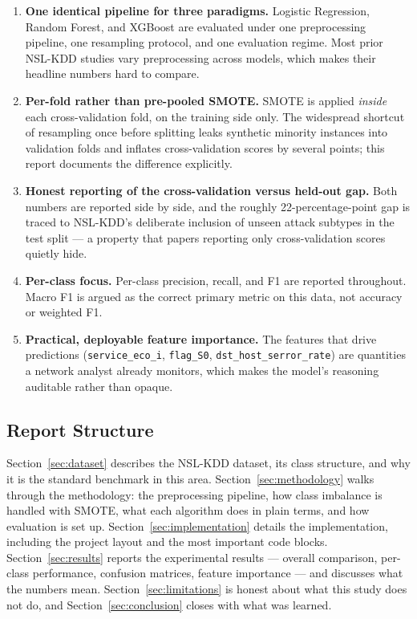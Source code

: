 \documentclass[11pt, a4paper]{article}
\begin{document}
\begin{enumerate}
    \item \textbf{One identical pipeline for three paradigms.} Logistic Regression, Random Forest, and XGBoost are evaluated under one preprocessing pipeline, one resampling protocol, and one evaluation regime. Most prior NSL-KDD studies vary preprocessing across models, which makes their headline numbers hard to compare.
    \item \textbf{Per-fold rather than pre-pooled SMOTE.} SMOTE is applied \emph{inside} each cross-validation fold, on the training side only. The widespread shortcut of resampling once before splitting leaks synthetic minority instances into validation folds and inflates cross-validation scores by several points; this report documents the difference explicitly.
    \item \textbf{Honest reporting of the cross-validation versus held-out gap.} Both numbers are reported side by side, and the roughly 22-percentage-point gap is traced to NSL-KDD's deliberate inclusion of unseen attack subtypes in the test split --- a property that papers reporting only cross-validation scores quietly hide.
    \item \textbf{Per-class focus.} Per-class precision, recall, and F1 are reported throughout. Macro F1 is argued as the correct primary metric on this data, not accuracy or weighted F1.
    \item \textbf{Practical, deployable feature importance.} The features that drive predictions (\texttt{service\_eco\_i}, \texttt{flag\_S0}, \texttt{dst\_host\_serror\_rate}) are quantities a network analyst already monitors, which makes the model's reasoning auditable rather than opaque.
\end{enumerate}

\subsection{Report Structure}
Section~\ref{sec:dataset} describes the NSL-KDD dataset, its class structure, and why it is the standard benchmark in this area. Section~\ref{sec:methodology} walks through the methodology: the preprocessing pipeline, how class imbalance is handled with SMOTE, what each algorithm does in plain terms, and how evaluation is set up. Section~\ref{sec:implementation} details the implementation, including the project layout and the most important code blocks. Section~\ref{sec:results} reports the experimental results --- overall comparison, per-class performance, confusion matrices, feature importance --- and discusses what the numbers mean. Section~\ref{sec:limitations} is honest about what this study does not do, and Section~\ref{sec:conclusion} closes with what was learned.
\end{document}
